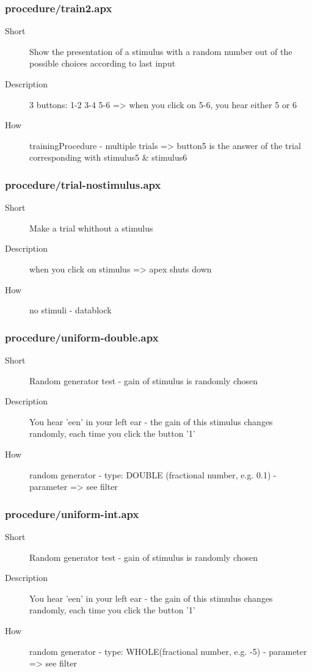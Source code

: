 \subsubsection{procedure/train2.apx}
\begin{description}
\item[Short] 
 Show the presentation of a stimulus with a random number out of the possible choices according to last input
\item[Description] 
 3 buttons: 1-2  3-4  5-6 =\textgreater{} when you click on 5-6, you hear either 5 or 6
\item[How] 
 trainingProcedure - multiple trials =\textgreater{} button5 is the answer of the trial corresponding with stimulus5 \& stimulus6
\end{description}

\subsubsection{procedure/trial-nostimulus.apx}
\begin{description}
\item[Short] 
 Make a trial whithout a stimulus
\item[Description] 
 when you click on stimulus =\textgreater{} apex shuts down
\item[How] 
 no stimuli - datablock
\end{description}

\subsubsection{procedure/uniform-double.apx}
\begin{description}
\item[Short] 
 Random generator test - gain of stimulus is randomly chosen
\item[Description] 
 You hear 'een' in your left ear - the gain of this stimulus changes randomly, each time you click the button '1'
\item[How] 
 random generator - type: DOUBLE (fractional number, e.g. 0.1) - parameter =\textgreater{} see filter
\end{description}

\subsubsection{procedure/uniform-int.apx}
\begin{description}
\item[Short] 
 Random generator test - gain of stimulus is randomly chosen
\item[Description] 
 You hear 'een' in your left ear - the gain of this stimulus changes randomly, each time you click the button '1'
\item[How] 
 random generator - type: WHOLE(fractional number, e.g. -5) - parameter =\textgreater{} see filter
\end{description}

